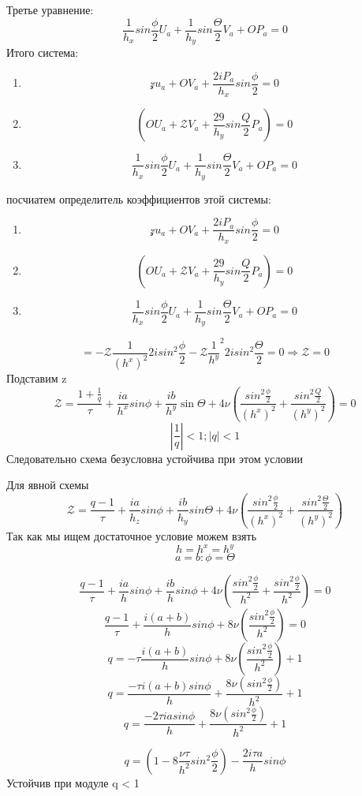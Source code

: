 \documentclass[12pt, a4paper]{article}
\begin{document}
Третье уравнение:
\[ \frac{1}{h_x} {sin}\frac{\phi}{2}U_a + \frac{1}{h_y} {sin} \frac{\Theta}{2} V_a + O P_a = 0 \]
Итого система:
\begin{enumerate}
	\item \[ \mathcal{z}u_a + O V_a + \frac{2i P_a}{h_x} {sin}\frac{\phi}{2} = 0 \]
	\item \[ (OU_a + \mathcal{Z} V_a + \frac{29}{h_y} {sin}\frac{Q}{2} P_a) = 0  \]
	\item \[ \frac{1}{h_x} {sin}\frac{\phi}{2}U_a + \frac{1}{h_y} {sin} \frac{\Theta}{2} V_a + O P_a = 0 \]
\end{enumerate}
посчиатем определитель коэффициентов этой системы:
\begin{enumerate}
	\item \[ \mathcal{z}u_a + O V_a + \frac{2i P_a}{h_x} {sin}\frac{\phi}{2} = 0 \]
	\item \[ (OU_a + \mathcal{Z} V_a + \frac{29}{h_y} {sin}\frac{Q}{2} P_a) = 0  \]
	\item \[ \frac{1}{h_x} {sin}\frac{\phi}{2}U_a + \frac{1}{h_y} {sin} \frac{\Theta}{2} V_a + O P_a = 0 \]
\end{enumerate}
\[ = - \mathcal{Z} \frac{1}{(h^x)^2} 2i {sin}^2 \frac{\phi}{2} - \mathcal{Z} \frac{1}{h^y}^2 2i {sin}^2 \frac{\Theta}{2} = 0 \Rightarrow \mathcal{Z} = 0\]
Подставим z
\[ \mathcal{Z} = \frac{1 + \frac{1}{q}}{\tau} + \frac{ia}{h^x} {sin} \phi + \frac{ib}{h^y} \sin \Theta + 4\nu (\frac{{sin}^2 \frac{\phi}{2}}{(h^x)^2} + \frac{{sin}^2\frac{Q}{2}}{(h^y)^2}) = 0 \]
\[ |\frac{1}{q}| < 1; |q| < 1\]
Следовательно схема безусловна устойчива при этом условии

Для явной схемы
\[ \mathcal{Z} = \frac{q-1}{\tau} + \frac{ia}{h_z} {sin} \phi + \frac{ib}{h_y} {sin} \Theta + 4 \nu (\frac{{sin}^2 \frac{\phi}{2}}{ (h^x)^2} + \frac{{sin}^2 \frac{\Theta}{2}}{(h^y)^2}) \]
Так как мы ищем достаточное условие можем взять
\[ h = h^x = h^y \]
\[ a = b: \phi = \Theta \]

\[ \frac{q-1}{\tau} + \frac{ia}{h}sin \phi + \frac{ib}{h} sin \phi + 4 \nu (\frac{{sin}^2\frac{\phi}{2}}{h^2} + \frac{{sin}^2 \frac{\phi}{2}}{h^2}) = 0 \]
\[ \frac{q-1}{\tau} + \frac{i(a+b)}{h} sin \phi + 8 \nu (\frac{{sin}^2 \frac{\phi}{2}}{h^2}) = 0 \]
\[ q = - \tau \frac{i(a+b)}{h} sin \phi + 8 \nu (\frac{{sin}^2 \frac{\phi}{2}}{h^2}) + 1 \]
\[ q = \frac{-\tau i(a+b) sin \phi}{h} + \frac{8 \nu (sin^2 \frac{\phi}{2})}{h^2} + 1 \]
\[ q = \frac{-2\tau ia sin \phi }{h}+ \frac{8 \nu (sin^2 \frac{\phi}{2})}{h^2} + 1 \]

\[ q = (1 - 8\frac{\nu \tau}{h^2} {sin^2} \frac{\phi}{2}) - \frac{2i\tau a}{h} {sin} \phi \]
Устойчив при модуле q < 1
\end{document}
